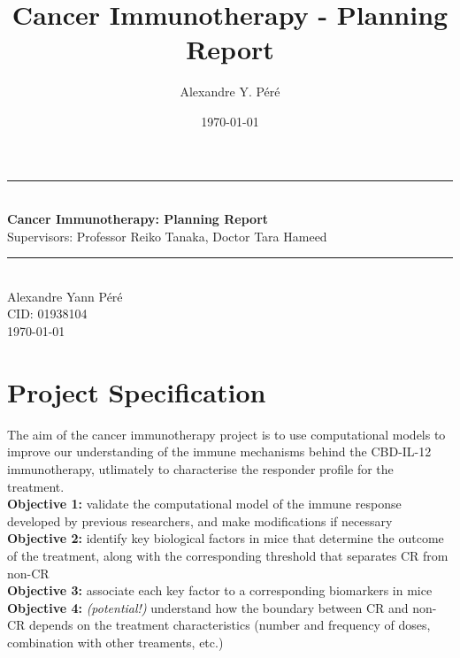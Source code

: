 \documentclass[11pt]{article}
\title{Cancer Immunotherapy - Planning Report}
\author{Alexandre Y. Péré }
\date{\today}
\begin{document}
\begin{titlepage}
    \newcommand{\HRule}{\rule{\linewidth}{0.5mm}}
    \begin{center}
        \HRule \\[0.4cm]
    { \huge \bfseries Cancer Immunotherapy: Planning Report \\[0.15cm] }
    Supervisors: Professor Reiko Tanaka, Doctor Tara Hameed 
    \\[0.4cm]
    \HRule \\[0.5cm]
    Alexandre Yann Péré \\[0.1cm]
    CID: 01938104  \\[0.1cm]
    \today \\ [0.1cm]
    \end{center}
\end{titlepage}

\tableofcontents


%

\pagebreak 
\section{Project Specification}


\par The aim of the cancer immunotherapy project is to use computational models to improve our understanding of the immune mechanisms behind the CBD-IL-12 immunotherapy, utlimately to characterise the responder profile for the treatment.\\[8pt]
\textbf{Objective 1:} validate the computational model of the immune response developed by previous researchers, and make modifications if necessary \\ 
\textbf{Objective 2:} identify key biological factors in mice that determine the outcome of the treatment, along with the corresponding threshold that separates CR from non-CR \\ 
\textbf{Objective 3:} associate each key factor to a corresponding biomarkers in mice\\ 
\textbf{Objective 4:} \textit{(potential!)}  understand how the boundary between CR and non-CR depends on the treatment characteristics (number and frequency of doses, combination with other treaments, etc.)
\end{document}
